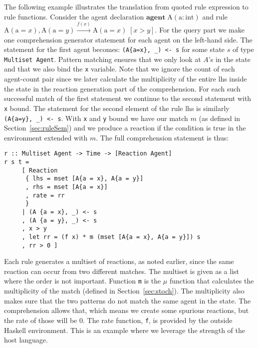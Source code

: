 \documentclass[phd]{infthesis}
\begin{document}
The following example illustrates the translation from quoted rule expression to
rule functions. Consider the agent declaration
$\mathbf{agent} \; \mathrm{A}(\mathrm{a}:\mathrm{int})$ and rule
$\mathrm{A}(\mathrm{a}=x), \mathrm{A}(\mathrm{a}=y) \xrightarrow{f(x)}
\mathrm{A}(\mathrm{a}=x) \; [x > y]$. For the query part we make one
comprehension generator statement for each agent on the left-hand side. The
statement for the first agent becomes: \texttt{(A\{a=x\}, \_) <- s} for some state
$s$ of type \texttt{Multiset Agent}. Pattern matching ensures that we only look
at $A$'s in the state and that we also bind the \texttt{x} variable. Note that
we ignore the count of each agent-count pair since we later calculate the
multiplicity of the entire lhs inside the state in the reaction generation part
of the comprehension.  For each such successful match of the first statement we
continue to the second statement with \texttt{x} bound. The statement for the
second element of the rule lhs is similarly \texttt{(A\{a=y\}, \_) <- s}.  With
\texttt{x} and \texttt{y} bound we have our match $m$ (as defined in
Section~\ref{sec:ruleSem}) and we produce a reaction if the condition is true in
the environment extended with $m$. The full comprehension statement is thus:
\begin{center}
\begin{BVerbatim}
r :: Multiset Agent -> Time -> [Reaction Agent]
r s t =
     [ Reaction
      { lhs = mset [A{a = x}, A{a = y}]
      , rhs = mset [A{a = x}]
      , rate = rr
      }
     | (A {a = x}, _) <- s
     , (A {a = y}, _) <- s
     , x > y
     , let rr = (f x) * m (mset [A{a = x}, A{a = y}]) s
     , rr > 0 ]
\end{BVerbatim}
\end{center}
Each rule generates a multiset of reactions, as noted earlier, since the same
reaction can occur from two different matches. The multiset is given as a list
where the order is not important. Function \texttt{m} is the $\mu$ function that
calculates the multiplicity of the match (defined in
Section~\ref{sec:stoch}). The multiplicity also makes sure that the two patterns
do not match the same agent in the state. The comprehension allows that, which
means we create some spurious reactions, but the rate of those will be 0. The
rate function, \texttt{f}, is provided by the outside Haskell environment. This
is an example where we leverage the strength of the host language.
\end{document}
